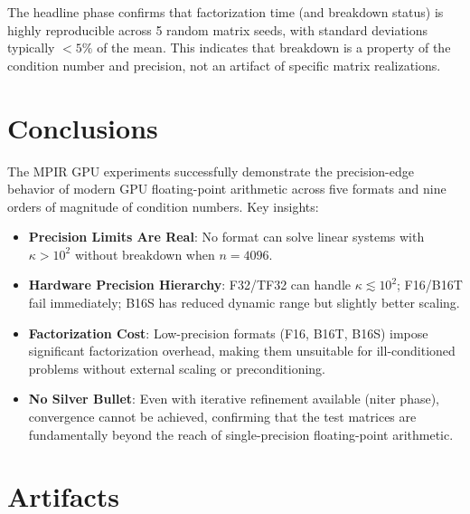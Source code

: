 \documentclass[11pt,a4paper]{article}
\begin{document}
The headline phase confirms that factorization time (and breakdown status) is highly reproducible across 5 random matrix seeds, with standard deviations typically $< 5\%$ of the mean. This indicates that breakdown is a property of the condition number and precision, not an artifact of specific matrix realizations.

\section{Conclusions}

The MPIR GPU experiments successfully demonstrate the precision-edge behavior of modern GPU floating-point arithmetic across five formats and nine orders of magnitude of condition numbers. Key insights:

\begin{itemize}
  \item \textbf{Precision Limits Are Real}: No format can solve linear systems with $\kappa > 10^2$ without breakdown when $n = 4096$.

  \item \textbf{Hardware Precision Hierarchy}: F32/TF32 can handle $\kappa \lesssim 10^2$; F16/B16T fail immediately; B16S has reduced dynamic range but slightly better scaling.

  \item \textbf{Factorization Cost}: Low-precision formats (F16, B16T, B16S) impose significant factorization overhead, making them unsuitable for ill-conditioned problems without external scaling or preconditioning.

  \item \textbf{No Silver Bullet}: Even with iterative refinement available (niter phase), convergence cannot be achieved, confirming that the test matrices are fundamentally beyond the reach of single-precision floating-point arithmetic.
\end{itemize}

\section{Artifacts}
\end{document}
